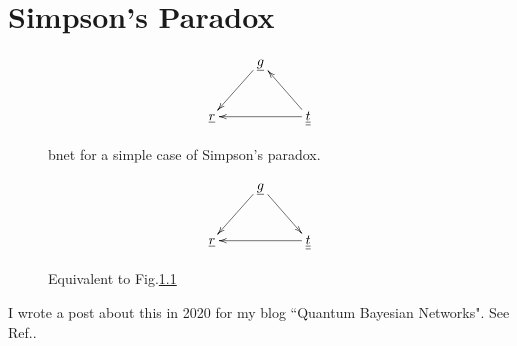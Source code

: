 \chapter{Simpson's Paradox}

\begin{figure}[h!]
\centering
$$\xymatrix{
&\rvg\ar[dl]&\\
\rvr&&\ul{\rvt}\ar[ul]\ar[ll]
}$$
\caption{bnet for a simple case of 
Simpson's paradox.}
\label{fig-simpson-a}
\end{figure}

\begin{figure}[h!]
\centering
$$\xymatrix{
&\rvg\ar[dl]\ar[dr]&\\
\rvr&&\ul{\rvt}\ar[ll]
}$$
\caption{Equivalent to 
Fig.\ref{fig-simpson-a}}
\label{fig-simpson-b}
\end{figure}

I wrote a post about
this in 2020 for
my blog ``Quantum Bayesian Networks". 
See Ref.\cite{simpson-blog}.